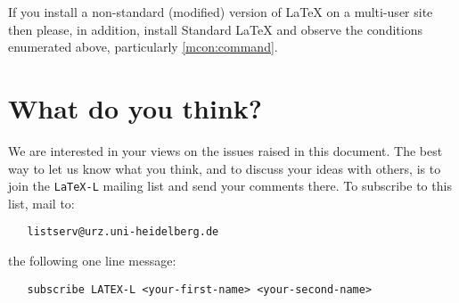 \documentclass{ltxguide}[1995/11/28]
\begin{document}
If you install a non-standard (modified) version of \LaTeX{} on a
multi-user site then please, in addition, install Standard \LaTeX{}
and observe the conditions enumerated above, particularly
\ref{mcon:command}.


\section{What do you think?}
\label{sec:you}

We are interested in your views on the issues raised in this document.
The best way to let us know what you think, and to discuss your ideas
with others, is to join the \texttt{LaTeX-L} mailing list and send your
comments there.
To subscribe to this list, mail to:
\begin{verbatim}
   listserv@urz.uni-heidelberg.de
\end{verbatim}
the following one line message:
\begin{verbatim}
   subscribe LATEX-L <your-first-name> <your-second-name>
\end{verbatim}
\end{document}
